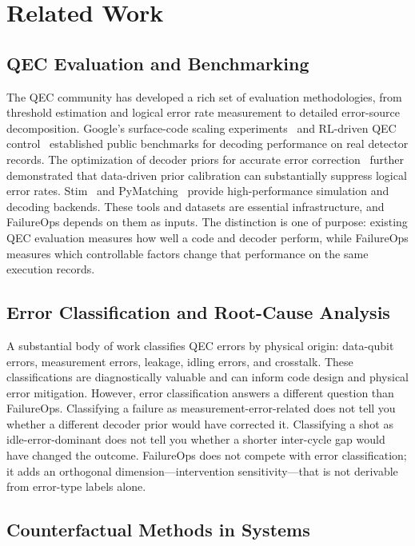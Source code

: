 \section{Related Work}

\subsection{QEC Evaluation and Benchmarking}

The QEC community has developed a rich set of evaluation methodologies, from threshold estimation and logical error rate measurement to detailed error-source decomposition. Google's surface-code scaling experiments~\cite{google2023,google2022} and RL-driven QEC control~\cite{google_rl_qec_2025} established public benchmarks for decoding performance on real detector records. The optimization of decoder priors for accurate error correction~\cite{sivak2024} further demonstrated that data-driven prior calibration can substantially suppress logical error rates. Stim~\cite{stim} and PyMatching~\cite{pymatching} provide high-performance simulation and decoding backends. These tools and datasets are essential infrastructure, and FailureOps depends on them as inputs. The distinction is one of purpose: existing QEC evaluation measures how well a code and decoder perform, while FailureOps measures which controllable factors change that performance on the same execution records.

\subsection{Error Classification and Root-Cause Analysis}

A substantial body of work classifies QEC errors by physical origin: data-qubit errors, measurement errors, leakage, idling errors, and crosstalk. These classifications are diagnostically valuable and can inform code design and physical error mitigation. However, error classification answers a different question than FailureOps. Classifying a failure as measurement-error-related does not tell you whether a different decoder prior would have corrected it. Classifying a shot as idle-error-dominant does not tell you whether a shorter inter-cycle gap would have changed the outcome. FailureOps does not compete with error classification; it adds an orthogonal dimension---intervention sensitivity---that is not derivable from error-type labels alone.

\subsection{Counterfactual Methods in Systems}

